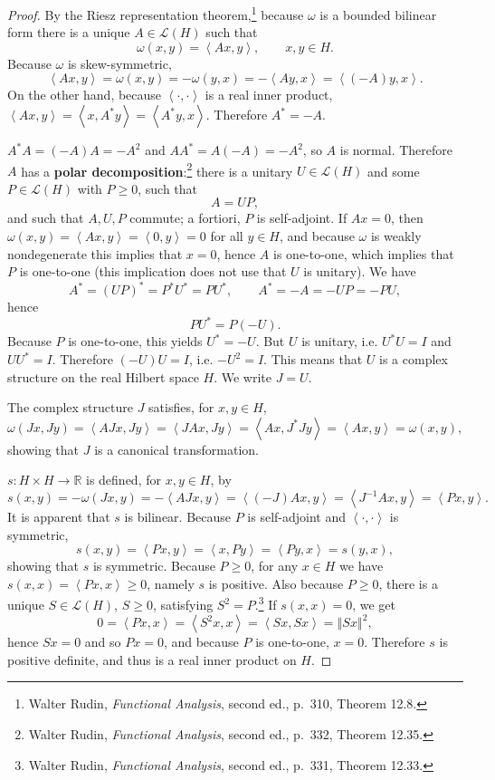 \documentclass{article}
\newcommand{\inner}[2]{\left\langle #1, #2 \right\rangle}
\newcommand{\norm}[1]{\left\Vert #1 \right\Vert}
\theoremstyle{definition}
\theoremstyle{definition}
\begin{document}
\begin{proof}
By the Riesz representation theorem,\footnote{Walter Rudin,
{\em Functional Analysis}, second ed., p.~310, Theorem 12.8.}
because $\omega$ is a bounded bilinear form there is a unique $A \in \mathscr{L}(H)$ such that
\begin{equation}
\omega(x,y) = \inner{Ax}{y}, \qquad x,y \in H.
\label{riesz}
\end{equation}
Because $\omega$ is skew-symmetric,
\[
\inner{Ax}{y} = \omega(x,y) = -\omega(y,x) = -\inner{Ay}{x} = \inner{(-A)y}{x}.
\]
On the other hand, because $\inner{\cdot}{\cdot}$ is a real inner product,
 $\inner{Ax}{y}=\inner{x}{A^*y}=\inner{A^*y}{x}$. Therefore $A^*=-A$. 

$A^*A = (-A)A=-A^2$ and $AA^*=A(-A)=-A^2$, so $A$ is normal. 
Therefore $A$ has a \textbf{polar decomposition}:\footnote{Walter Rudin,
{\em Functional Analysis}, second ed., p.~332, Theorem 12.35.}
there is a unitary $U \in \mathscr{L}(H)$ and some $P \in \mathscr{L}(H)$ with
$P \geq 0$,
 such that
\[
A=UP,
\]
and such that $A,U,P$ commute; a fortiori, $P$ is self-adjoint.
If $Ax=0$, then $\omega(x,y)=\inner{Ax}{y}=\inner{0}{y}=0$ for all $y \in H$, and because $\omega$ is weakly nondegenerate this implies
that $x=0$, hence $A$ is one-to-one, which implies that $P$ is one-to-one (this implication
does not  use that $U$ is unitary). 
We have
\[
A^*=(UP)^*=P^*U^*=PU^*, \qquad A^*=-A=-UP=-PU,
\]
hence
\[
PU^*=P(-U).
\]
Because $P$ is one-to-one, this yields $U^*=-U$.
But $U$ is unitary, i.e. $U^*U=I$ and $UU^*=I$. 
Therefore $(-U)U=I$, i.e. $-U^2=I$. 
This means that $U$ is a complex structure on the real Hilbert space $H$. We write $J=U$.

The complex structure $J$ satisfies, for $x,y \in H$,
\[
\omega(Jx,Jy) = \inner{AJx}{Jy} = \inner{JAx}{Jy} = \inner{Ax}{J^*Jy}
=\inner{Ax}{y}=\omega(x,y),
\]
showing that $J$ is a canonical transformation.

$s:H \times H \to \mathbb{R}$ is defined, for $x,y \in H$, by
\[
s(x,y) = -\omega(Jx,y) = -\inner{AJx}{y} = \inner{(-J)Ax}{y}=
\inner{J^{-1}Ax}{y}
=\inner{Px}{y}.
\]
It is apparent that $s$ is bilinear. Because $P$ is self-adjoint and $\inner{\cdot}{\cdot}$ is symmetric,
\[
s(x,y) = \inner{Px}{y} = \inner{x}{Py} = \inner{Py}{x} = s(y,x),
\]
showing that $s$ is symmetric.
Because $P \geq 0$, for any $x \in H$ we have $s(x,x)=\inner{Px}{x} \geq 0$, namely $s$ is positive.
Also because $P \geq 0$, there is a unique $S \in \mathscr{L}(H)$, $S \geq 0$, satisfying
$S^2=P$.\footnote{Walter Rudin, {\em Functional Analysis}, second ed.,
p.~331, Theorem 12.33.}
If $s(x,x)=0$, we get
\[
0=\inner{Px}{x}=\inner{S^2x}{x}=\inner{Sx}{Sx}=\norm{Sx}^2,
\]
hence $Sx=0$ and so $Px=0$, and because $P$ is one-to-one, $x=0$.
Therefore
$s$ is positive definite, and thus is a real inner product on $H$. 


\end{proof}
\end{document}
